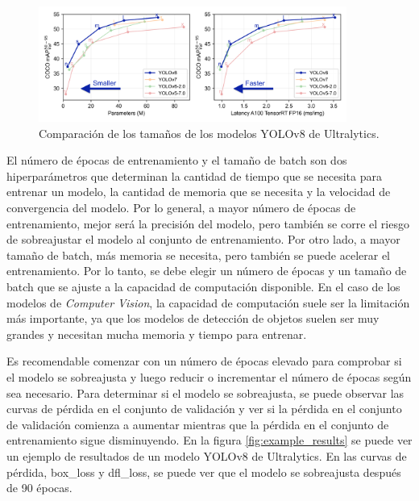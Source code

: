 \begin{figure}[H]
    \centering
    \includegraphics[width=0.9\textwidth]{graphs/yolo-comparison-plots.png}
    \caption{Comparación de los tamaños de los modelos YOLOv8 de Ultralytics.}
    \label{fig:yolo-comparison-plots}
\end{figure}

El número de épocas de entrenamiento y el tamaño de batch son dos hiperparámetros que determinan la cantidad de tiempo que se necesita para entrenar un modelo, la cantidad de memoria que se necesita y la velocidad de convergencia del modelo. Por lo general, a mayor número de épocas de entrenamiento, mejor será la precisión del modelo, pero también se corre el riesgo de sobreajustar el modelo al conjunto de entrenamiento. Por otro lado, a mayor tamaño de batch, más memoria se necesita, pero también se puede acelerar el entrenamiento. Por lo tanto, se debe elegir un número de épocas y un tamaño de batch que se ajuste a la capacidad de computación disponible. En el caso de los modelos de \textit{Computer Vision}, la capacidad de computación suele ser la limitación más importante, ya que los modelos de detección de objetos suelen ser muy grandes y necesitan mucha memoria y tiempo para entrenar.

Es recomendable comenzar con un número de épocas elevado para comprobar si el modelo se sobreajusta y luego reducir o incrementar el número de épocas según sea necesario. Para determinar si el modelo se sobreajusta, se puede observar las curvas de pérdida en el conjunto de validación y ver si la pérdida en el conjunto de validación comienza a aumentar mientras que la pérdida en el conjunto de entrenamiento sigue disminuyendo. En la figura \ref{fig:example_results} se puede ver un ejemplo de resultados de un modelo YOLOv8 de Ultralytics. En las curvas de pérdida, box\_loss y dfl\_loss, se puede ver que el modelo se sobreajusta después de 90 épocas.

